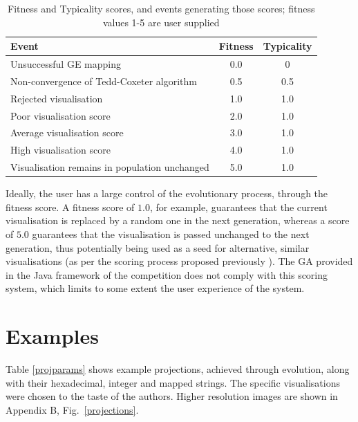 \documentclass{article}
\begin{document}
\begin{center}
	\begin{table}[th]
	\caption{Fitness and Typicality scores, and events generating those
	scores; fitness values 1-5 are user supplied}
	\begin{tabular}{|l|c|c|}
		\hline
		Event & Fitness & Typicality\\
		\hline
		Unsuccessful GE mapping & 0.0 & 0\\
		\hline
		Non-convergence of Tedd-Coxeter algorithm & 0.5 & 0.5\\
		\hline
		Rejected visualisation & 1.0 & 1.0\\
		\hline
		Poor visualisation score & 2.0 & 1.0\\
		\hline
		Average visualisation score & 3.0 & 1.0\\
		\hline
		High visualisation score & 4.0 & 1.0\\
		\hline
		Visualisation remains in population unchanged & 5.0 & 1.0\\
		\hline
	\end{tabular}
	\label{fittyp}
	\end{table}
\end{center}

Ideally, the user has a large control of the evolutionary process, through the
fitness score. A fitness score of $1.0$, for example, guarantees that the
current visualisation is replaced by a random one in the next generation,
whereas a score of $5.0$ guarantees that the visualisation is passed unchanged
to the next generation, thus potentially being used as a seed for alternative,
similar visualisations (as per the scoring process proposed previously
\cite{nicolau2011a}).
The GA provided in the Java framework of the competition does not comply with
this scoring system, which limits to some extent the user experience of the
system.

\section{Examples}
\label{examples}

Table  \ref{projparams} shows example projections, achieved through evolution,
along with their hexadecimal, integer and mapped strings. The specific
visualisations were chosen to the taste of the authors. Higher resolution
images are shown in Appendix B, Fig.~\ref{projections}.
\end{document}
